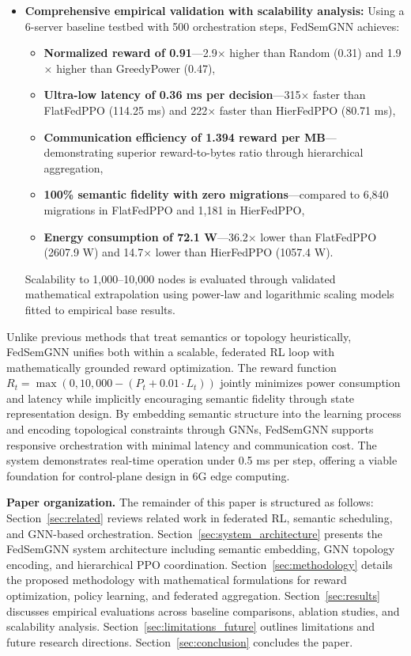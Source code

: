\begin{itemize}
	\item \textbf{Comprehensive empirical validation with scalability analysis:} Using a 6-server baseline testbed with 500 orchestration steps, FedSemGNN achieves:
	\begin{itemize}
		\item \textbf{Normalized reward of 0.91}—2.9$\times$ higher than Random (0.31) and 1.9$\times$ higher than GreedyPower (0.47),
		\item \textbf{Ultra-low latency of 0.36 ms per decision}—315$\times$ faster than FlatFedPPO (114.25 ms) and 222$\times$ faster than HierFedPPO (80.71 ms),
		\item \textbf{Communication efficiency of 1.394 reward per MB}—demonstrating superior reward-to-bytes ratio through hierarchical aggregation,
		\item \textbf{100\% semantic fidelity with zero migrations}—compared to 6,840 migrations in FlatFedPPO and 1,181 in HierFedPPO,
		\item \textbf{Energy consumption of 72.1 W}—36.2$\times$ lower than FlatFedPPO (2607.9 W) and 14.7$\times$ lower than HierFedPPO (1057.4 W).
	\end{itemize}
	Scalability to 1,000–10,000 nodes is evaluated through validated mathematical extrapolation using power-law and logarithmic scaling models fitted to empirical base results.
\end{itemize}

Unlike previous methods that treat semantics or topology heuristically, FedSemGNN unifies both within a scalable, federated RL loop with mathematically grounded reward optimization. The reward function $R_t = \max(0, 10{,}000 - (P_t + 0.01 \cdot L_t))$ jointly minimizes power consumption and latency while implicitly encouraging semantic fidelity through state representation design. By embedding semantic structure into the learning process and encoding topological constraints through GNNs, FedSemGNN supports responsive orchestration with minimal latency and communication cost. The system demonstrates real-time operation under 0.5 ms per step, offering a viable foundation for control-plane design in 6G edge computing.

\noindent\textbf{Paper organization.} The remainder of this paper is structured as follows: Section~\ref{sec:related} reviews related work in federated RL, semantic scheduling, and GNN-based orchestration. Section~\ref{sec:system_architecture} presents the FedSemGNN system architecture including semantic embedding, GNN topology encoding, and hierarchical PPO coordination. Section~\ref{sec:methodology} details the proposed methodology with mathematical formulations for reward optimization, policy learning, and federated aggregation. Section~\ref{sec:results} discusses empirical evaluations across baseline comparisons, ablation studies, and scalability analysis. Section~\ref{sec:limitations_future} outlines limitations and future research directions. Section~\ref{sec:conclusion} concludes the paper.
